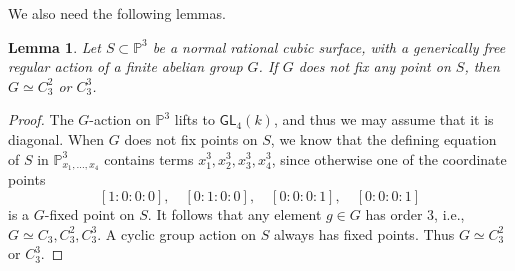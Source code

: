 \documentclass[12pt,reqno]{amsart}
\theoremstyle{plain}
\newtheorem{lemm}[prop]{Lemma}
\theoremstyle{remark}
\theoremstyle{definition}
\numberwithin{equation}{section}
\def\bP{{\mathbb P}}
\def\GL{\mathsf{GL}}
\begin{document}
We also need the following lemmas.
\begin{lemm}\label{lemm:cubsurfgp}
    Let $S\subset \bP^3$ be a normal rational cubic surface, with a generically free regular action of a finite abelian group $G$. If $G$ does not fix any point on $S$, then $G\simeq C_3^2$ or $C_3^3$.
\end{lemm}
 \begin{proof}
    The $G$-action on $\bP^3$ lifts to $\GL_4(k)$, and thus we may assume that it is diagonal. When $G$ does not fix points on $S$, we know that the defining equation of $S$ in $\bP^3_{x_1,\ldots,x_4}$ contains terms $x_1^3,x_2^3,x_3^3,x_4^3$, since otherwise one of the coordinate points 
    $$
    [1:0:0:0],\quad [0:1:0:0],\quad [0:0:0:1],\quad [0:0:0:1]
    $$
    is a $G$-fixed point on $S$. It follows that any element  $g\in G$ has order $3$, i.e., $G\simeq C_3, C_3^2,C_3^3$. A cyclic group action on $S$ always has fixed points. Thus $G\simeq C_3^2$ or $C_3^3$.
 \end{proof}
\end{document}

